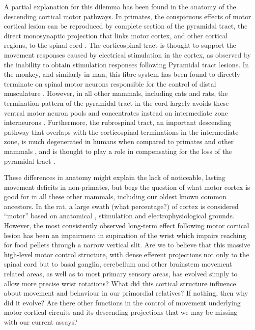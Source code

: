 A partial explanation for this dilemma has been found in the anatomy of the descending cortical motor pathways. In primates, the conspicuous effects of motor cortical lesion can be reproduced by complete section of the pyramidal tract, the direct monosynaptic projection that links motor cortex, and other cortical regions, to the spinal cord \cite{Tower1940,Lawrence1968}. The corticospinal tract is thought to support the movement responses caused by electrical stimulation in the cortex, as observed by the inability to obtain stimulation responses following Pyramidal tract lesions. In the monkey, and similarly in man, this fibre system has been found to directly terminate on spinal motor neurons responsible for the control of distal musculature \cite{Leyton1917,Bernhard1954}. However, in all other mammals, including cats and rats, the termination pattern of the pyramidal tract in the cord largely avoids these ventral motor neuron pools and concentrates instead on intermediate zone interneurons \cite{Kuypers1981,Yang2003}. Furthermore, the rubrospinal tract, an important descending pathway that overlaps with the corticospinal terminations in the intermediate zone, is much degenerated in humans when compared to primates and other mammals \cite{Square1982}, and is thought to play a role in compensating for the loss of the pyramidal tract \cite{Lawrence1968a}.

These differences in anatomy might explain the lack of noticeable, lasting movement deficits in non-primates, but begs the question of what motor cortex is good for in all these other mammals, including our oldest known common ancestors. In the rat, a large swath (what percentage?) of cortex is considered ``motor'' based on anatomical \cite{Donoghue1982}, stimulation \cite{Donoghue1982,Neafsey1986} and electrophysiological grounds. However, the most consistently observed long-term effect following motor cortical lesion has been an impairment in supination of the wrist which impairs reaching for food pellets through a narrow vertical slit. Are we to believe that this massive high-level motor control structure, with dense efferent projections not only to the spinal cord but to basal ganglia, cerebellum and other brainstem movement related areas, as well as to most primary sensory areas, has evolved simply to allow more precise wrist rotations? What did this cortical structure influence about movement and behaviour in our primordial relatives? If nothing, then why did it evolve? Are there other functions in the control of movement underlying motor cortical circuits and its descending projections that we may be missing with our current assays?

